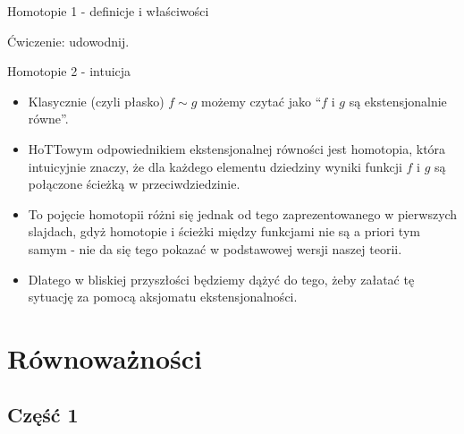 \documentclass{beamer}
\begin{document}
\begin{frame}{Homotopie 1 - definicje i właściwości}


Ćwiczenie: udowodnij.

\end{frame}

\begin{frame}{Homotopie 2 - intuicja}
\begin{itemize}
	\item Klasycznie (czyli płasko) $f \sim g$ możemy czytać jako ``$f$ i $g$ są ekstensjonalnie równe''.
	\item HoTTowym odpowiednikiem ekstensjonalnej równości jest homotopia, która intuicyjnie znaczy, że dla każdego elementu dziedziny wyniki funkcji $f$ i $g$ są połączone ścieżką w przeciwdziedzinie.
	\item To pojęcie homotopii różni się jednak od tego zaprezentowanego w pierwszych slajdach, gdyż homotopie i ścieżki między funkcjami nie są a priori tym samym - nie da się tego pokazać w podstawowej wersji naszej teorii.
	\item Dlatego w bliskiej przyszłości będziemy dążyć do tego, żeby załatać tę sytuację za pomocą aksjomatu ekstensjonalności.
\end{itemize}
\end{frame}

\section{Równoważności}

\subsection{Część 1}
\end{document}

